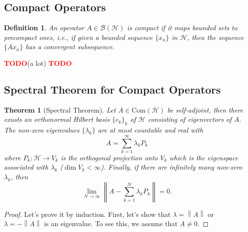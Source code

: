\documentclass{article}
\newtheorem*{theorem}{Theorem}
\newtheorem*{definition}{Definition}
\newcommand{\B}{\mathcal{B}}
\renewcommand{\H}{\mathcal{H}}
\newcommand{\norm}[1]{\left\lVert#1 \right\rVert}
\newcommand{\td}{\textcolor{red}{\textbf{TODO}}}
\begin{document}
\subsection{Compact Operators}

\begin{definition}
    An operator $A \in \B(\H)$ is compact if it maps bounded sets to precompact ones, i.e., if given a bounded sequence $\{x_n\}$ in $\H$, then the sequence $\{Ax_n\}$ has a convergent subsequence.
\end{definition}

\td (a lot) \td 

\subsection{Spectral Theorem for Compact Operators}

\begin{theorem}[Spectral Theorem]
    Let $A \in \text{Com}(\H)$ be self-adjoint, then there exusts an orthonormal Hilbert basis $\{e_k\}_k$ of $\H$ consisting of eigenvectors of $A$. The non-zero eigenvalues $\{\lambda_k\}$ are at most countable and real with
    $$A = \sum_{k=1}^{\infty}\lambda_k P_k$$
    where $P_k : \H \to V_k$ is the orthogonal projection onto $V_k$ which is the eigenspace associated with $\lambda_k$ ($\dim V_k < \infty$). Finally, if there are infinitely many non-zero $\lambda_k$, then
    $$\lim_{N \rightarrow \infty}\norm{A - \sum_{k=1}^{N}\lambda_k P_k} = 0.$$
\end{theorem}

\begin{proof}
    Let's prove it by induction. First, let's show that $\lambda = \norm{A}$ or $\lambda = -\norm{A}$ is an eigenvalue. To see this, we assume that $A \neq 0$.
\end{proof}
\end{document}

